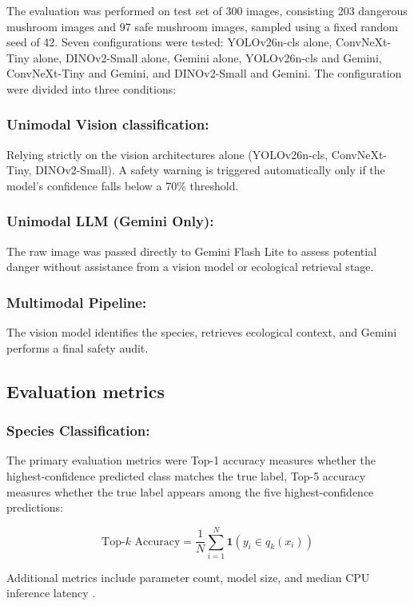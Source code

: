 \documentclass[journal,transmag]{IEEEtran}
\begin{document}
The evaluation was performed on test set of 300 images, consisting 203 dangerous mushroom images and 97 safe mushroom images, sampled using a fixed random seed of 42. Seven configurations were tested: YOLOv26n-cls alone, ConvNeXt-Tiny alone, DINOv2-Small alone, Gemini alone, YOLOv26n-cls and Gemini, ConvNeXt-Tiny and Gemini, and DINOv2-Small and Gemini. The configuration were divided into three conditions:

\subsubsection{\textbf{Unimodal Vision classification:}} Relying strictly on the vision architectures alone (YOLOv26n-cls, ConvNeXt-Tiny, DINOv2-Small). A safety warning is triggered automatically only if the model's confidence falls below a 70\% threshold.
\subsubsection{\textbf{Unimodal LLM (Gemini Only)}:} The raw image was passed directly to Gemini Flash Lite to assess potential danger without assistance from a vision model or ecological retrieval stage.
\subsubsection{\textbf{Multimodal Pipeline:}} The vision model identifies the species, retrieves ecological context, and Gemini performs a final safety audit.




\subsection{Evaluation metrics} 
\subsubsection{Species Classification:} The primary evaluation metrics were Top-1 accuracy  measures whether the highest-confidence predicted class matches the true label, Top-5 accuracy measures whether the true label appears among the five highest-confidence predictions: 

\begin{equation}
\text{Top-}k\text{ Accuracy} = 
\frac{1}{N}\sum_{i=1}^{N} 
\mathbf{1}\left(y_i \in q_k(x_i)\right)
\end{equation}

Additional metrics include parameter count, model size, and median CPU inference latency \cite{picek2022danishfungi,picek2025fungitastic}.
\end{document}
